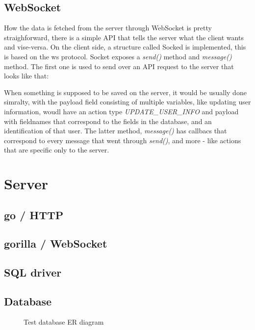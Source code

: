 \subsection{WebSocket}
How the data is fetched from the server through WebSocket is pretty straighforward, there is a simple API that tells the server what the client wants and vise-versa. On the client side, a structure called Socked is implemented, this is based on the ws protocol. Socket exposes a \emph{send()} method and \emph{message()} method. The first one is used to send over an API request to the server that looks like that:

When something is supposed to be saved on the server, it would be usually done simralty, with the payload field consisting of multiple variables, like updating user information, woudl have an action type \emph{UPDATE\_USER\_INFO} and payload with fieldnames that correspond to the fields in the database, and an identification of that user. The latter method, \emph{message()} has callbacs that correspond to every message that went through \emph{send()}, and more - like actions that are specific only to the server.


\section{Server}
\subsection{go / HTTP}
\subsection{gorilla / WebSocket}
\subsection{SQL driver}
\subsection{Database}

\begin{figure}[h]
  \centering
  \caption{Test database ER diagram}
  \label{fig:groupmanagement}
\end{figure}
